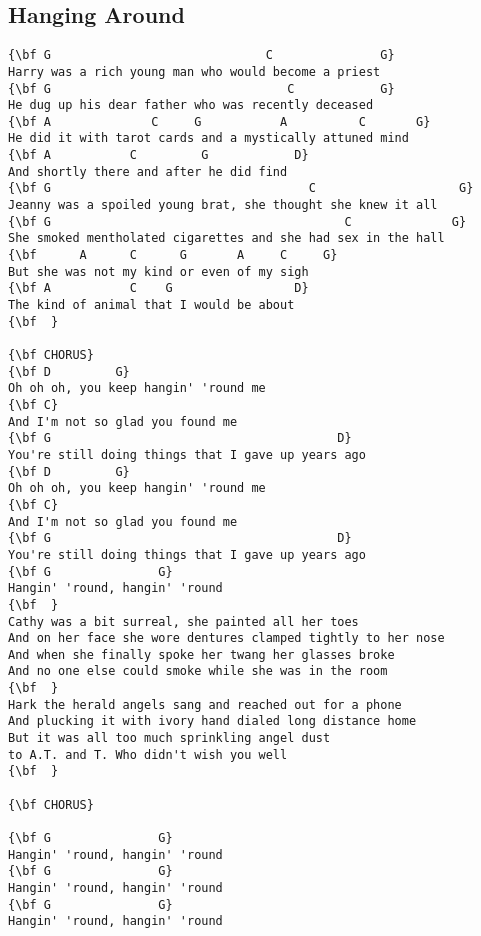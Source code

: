 \documentclass[a4paper]{article}
\begin{document}
\subsection{Hanging Around} %
\label{sub:Hanging Arou}
\begin{Verbatim}[commandchars=\\\{\}]
{\bf G                              C               G}
Harry was a rich young man who would become a priest
{\bf G                                 C            G}
He dug up his dear father who was recently deceased
{\bf A              C     G           A          C       G}
He did it with tarot cards and a mystically attuned mind
{\bf A           C         G            D}
And shortly there and after he did find
{\bf G                                    C                    G}
Jeanny was a spoiled young brat, she thought she knew it all
{\bf G                                         C              G}
She smoked mentholated cigarettes and she had sex in the hall
{\bf      A      C      G       A     C     G}
But she was not my kind or even of my sigh
{\bf A           C    G                 D}
The kind of animal that I would be about
{\bf  }

{\bf CHORUS}
{\bf D         G}
Oh oh oh, you keep hangin' 'round me
{\bf C}
And I'm not so glad you found me
{\bf G                                        D}
You're still doing things that I gave up years ago
{\bf D         G}
Oh oh oh, you keep hangin' 'round me
{\bf C}
And I'm not so glad you found me
{\bf G                                        D}
You're still doing things that I gave up years ago
{\bf G               G}
Hangin' 'round, hangin' 'round
{\bf  }
Cathy was a bit surreal, she painted all her toes
And on her face she wore dentures clamped tightly to her nose
And when she finally spoke her twang her glasses broke
And no one else could smoke while she was in the room
{\bf  }
Hark the herald angels sang and reached out for a phone
And plucking it with ivory hand dialed long distance home
But it was all too much sprinkling angel dust
to A.T. and T. Who didn't wish you well
{\bf  }

{\bf CHORUS}

{\bf G               G}
Hangin' 'round, hangin' 'round
{\bf G               G}
Hangin' 'round, hangin' 'round
{\bf G               G}
Hangin' 'round, hangin' 'round
\end{Verbatim}
\newpage
\end{document}
